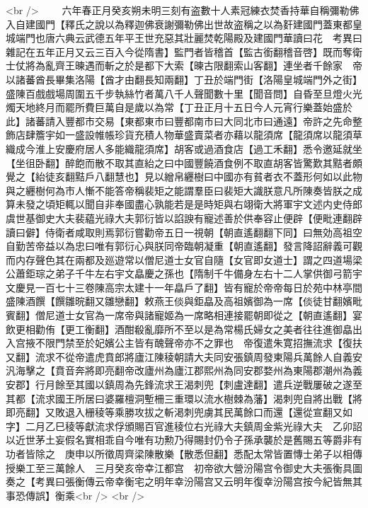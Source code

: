 <br />
　　六年春正月癸亥朔未明三刻有盗數十人素冠練衣焚香持華自稱彌勒佛入自建國門【釋氏之說以為釋迦佛衰謝彌勒佛出世故盗稱之以為姧建國門蓋東都皇城端門也唐六典云武德五年平王世充惡其壯麗焚乾陽殿及建國門華讀曰花　考異曰雜記在五年正月又云三百入今從隋書】監門者皆稽首【監古銜翻稽音啓】既而奪衛士仗將為亂齊王暕遇而斬之於是都下大索【暕古限翻索山客翻】連坐者千餘家　帝以諸蕃酋長畢集洛陽【酋才由翻長知兩翻】丁丑於端門街【洛陽皇城端門外之街】盛陳百戲戲場周圍五千步執絲竹者萬八千人聲聞數十里【聞音問】自昏至旦燈火光燭天地終月而罷所費巨萬自是歲以為常【丁丑正月十五日今人元宵行樂蓋始盛於此】諸蕃請入豐都市交易【東都東市曰豐都南市曰大同北市曰通遠】帝許之先命整飾店肆簷宇如一盛設帷帳珍貨充積人物華盛賣菜者亦藉以龍須席【龍須席以龍須草織成今淮上安慶府居人多能織龍須席】胡客或過酒食店【過工禾翻】悉令邀延就坐【坐徂卧翻】醉飽而散不取其直紿之曰中國豐饒酒食例不取直胡客皆驚歎其黠者頗覺之【紿徒亥翻黠戶八翻慧也】見以繒帛纒樹曰中國亦有貧者衣不蓋形何如以此物與之纒樹何為市人慚不能答帝稱裴矩之能謂羣臣曰裴矩大識朕意凡所陳奏皆朕之成算未發之頃矩輒以聞自非奉國盡心孰能若是是時矩與右翊衛大將軍宇文述内史侍郎虞世基御史大夫裴藴光祿大夫郭衍皆以諂諛有寵述善於供奉容止便辟【便毗連翻辟讀曰僻】侍衛者咸取則焉郭衍嘗勸帝五日一視朝【朝直遙翻翻下同】曰無効高祖空自勤苦帝益以為忠曰唯有郭衍心與朕同帝臨朝凝重【朝直遙翻】發言降詔辭義可觀而内存聲色其在兩都及廵遊常以僧尼道士女官自隨【女官即女道士】謂之四道場梁公蕭鉅琮之弟子千牛左右宇文皛慶之孫也【隋制千牛備身左右十二人掌供御弓箭宇文慶見一百七十三卷陳高宗太建十一年皛戶了翻】皆有寵於帝帝每日於苑中林亭間盛陳酒饌【饌雛晥翻又雛戀翻】敕燕王倓與鉅皛及高祖嬪御為一席【倓徒甘翻嬪毗賓翻】僧尼道士女官為一席帝與諸寵姬為一席略相連接罷朝即從之【朝直遙翻】宴飲更相勸侑【更工衡翻】酒酣殽亂靡所不至以是為常楊氏婦女之美者往往進御皛出入宫掖不限門禁至於妃嬪公主皆有醜聲帝亦不之罪也　帝復遣朱寛招撫流求【復扶又翻】流求不從帝遣虎賁郎將廬江陳稜朝請大夫同安張鎮周發東陽兵萬餘人自義安汎海擊之【賁音奔將即亮翻帝改廬州為廬江郡熙州為同安郡婺州為東陽郡潮州為義安郡】行月餘至其國以鎮周為先鋒流求王渴刺兜【刺盧達翻】遣兵逆戰屢破之遂至其都【流求國王所居曰婆羅檀洞塹柵三重環以流水樹棘為藩】渴刺兜自將出戰【將即亮翻】又敗退入栅稜等乘勝攻拔之斬渇刺兜虜其民萬餘口而還【還從宣翻又如字】二月乙巳稜等獻流求俘頒賜百官進稜位右光祿大夫鎮周金紫光祿大夫　乙卯詔以近世茅土妄假名實相乖自今唯有功勲乃得賜封仍令子孫承襲於是舊賜五等爵非有功者皆除之　庚申以所徵周齊梁陳散樂【散悉但翻】悉配太常皆置慱士弟子以相傳授樂工至三萬餘人　三月癸亥帝幸江都宫　初帝欲大營汾陽宫令御史大夫張衡具圖奏之【考異曰張衡傳云帝幸衡宅之明年幸汾陽宫又云明年復幸汾陽宫按今紀皆無其事恐傳誤】衡乘<br />
<br />
